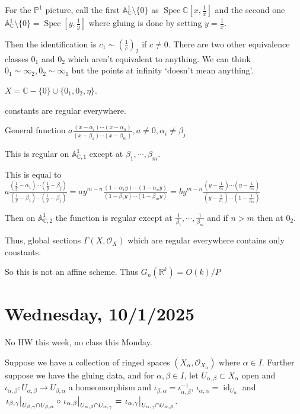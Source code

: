 \documentclass{article}
\theoremstyle{definition}
\begin{document}
    For the \(\mathbb{P}^1\) picture, call the first \(\mathbb{A}^1_{\mathbb{C}} \setminus \{ 0 \}\) as \(\operatorname{Spec} \mathbb{C} \left[ x, \frac{1}{x} \right] \) and the second one \(\mathbb{A}^1_{\mathbb{C}} \setminus \{ 0 \} = \operatorname{Spec} \left[ y, \frac{1}{y} \right]\) where gluing is done by setting \(y = \frac{1}{x}\).
    
    Then the identification is \(c_1 \sim \left( \frac{1}{c} \right)_2\) if \(c\neq 0\). There are two other equivalence classes \(0_1\) and \(0_2\) which aren't equivalent to anything. We can think \(0_1 \sim \infty_2, 0_2 \sim \infty_1\) but the points at infinity `doesn't mean anything'.

    \(X = \mathbb{C} - \{ 0 \} \cup \{ 0_1, 0_2, \eta \}\).

    constants are regular everywhere.

    General function \(a \frac{(x-\alpha_i) \cdots (x - \alpha_n)}{(x - \beta_1) \cdots (x-\beta_m)}, a \neq 0, \alpha_i \neq \beta_j\) 

    This is regular on \(\mathbb{A}^1_{\mathbb{C},1}\) except at \(\beta_1, \cdots , \beta_m\).

    This is equal to \(a \frac{\left( \frac{1}{y}-\alpha_1 \right) \cdots \left( \frac{1}{y}-\beta_j \right)}{\left( \frac{1}{y}-\beta_1 \right) \cdots \left( \frac{1}{y}- \beta_j \right)} = a y^{m-n} \frac{(1 - \alpha_1 y) \cdots (1 - \alpha_n y)}{(1-\beta_1 y) \cdots (1 - \beta_m y)} = b y^{m - n} \frac{\left( y - \frac{1}{\alpha_1} \right) \cdots \left( y - \frac{1}{\alpha_n} \right) }{\left( y - \frac{1}{\beta_1} \right) \cdots \left( 1- \frac{1}{\beta_m} \right)}\)
    
    Then on \(\mathbb{A}^1_{\mathbb{C},2}\) the function is regular except at \(\frac{1}{\beta_1}, \cdots , \frac{1}{\beta_m}\) and if \(n > m\) then at \(0_2\).
    
    Thus, global sections \(\Gamma(X, \mathcal{O}_X)\)  which are regular everywhere contains only constants.

    So this is not an affine scheme.
    Thus \(G_n(\mathbb{R}^k) = O(k) / P\) 

    \section*{Wednesday, 10/1/2025}
    
    No HW this week, no class this Monday.

    Suppose we have a collection of ringed spaces \((X_\alpha , \mathcal{O}_{X_\alpha})\) where \(\alpha \in I\). Further suppose we have the gluing data, and for \(\alpha,\beta \in I\), let \(U_{\alpha, \beta} \subset X_\alpha\) open and \(\iota_{\alpha,\beta}: U_{\alpha, \beta} \to U_{\beta,\alpha}\) a homeomorphism and \(\iota_{\beta,\alpha} = \iota_{\alpha,\beta} ^{-1}\), \(\iota_{\alpha,\alpha} = \operatorname{id}_{U_\alpha}\) and \(\eval{\iota_{\beta,\gamma}}_{U_{\beta,\gamma} \cap U_{\beta,\alpha}} \circ \eval{\iota_{\alpha,\beta}}_{U_{\alpha,\beta} \cap U_{\alpha,\gamma}} = \eval{\iota_{\alpha,\gamma}}_{U_{\alpha , \gamma}\cap U_{\alpha,\beta}}\).
    
\end{document}
